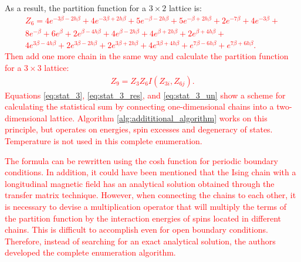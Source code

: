 \documentclass[preprint,12pt]{elsarticle}
\begin{document}
	As a result, the partition function for a $3 \times 2$ lattice is:
	\textcolor{red}{
	\begin{equation}
		\label{eq:stat_3_res}
		\begin{alignedat}{3}
			Z_6 = 4 e^{ - 3 \beta-2 h\beta} + 4 e^{- 3 \beta+2 h\beta} + 5 e^{- \beta-2 h\beta } + 5 e^{- \beta+2 h\beta } + 2 e^{-7 \beta} + 4 e^{-3 \beta} + \\
			8 e^{-\beta} + 6 e^{\beta} + 2 e^{\beta-4 h\beta } + 4 e^{\beta-2 h\beta } + 4 e^{\beta+2 h\beta } + 2 e^{\beta+4 h\beta } + \\
			4 e^{3 \beta-4 h\beta } + 2 e^{3 \beta-2 h\beta } + 2 e^{3 \beta+2 h\beta } + 4 e^{3 \beta+4 h\beta } + e^{7 \beta-6 h\beta } + e^{7 \beta+6 h\beta }.
		\end{alignedat}
	\end{equation}
}
\textcolor{red}{Then add one more chain in the same way and calculate the partition function for a $3 \times 3$ lattice:}
\textcolor{red}{
\begin{equation}
	\label{eq:stat_9_un}
	\begin{alignedat}{2}
		Z_9 =  Z_{3}Z_{6}I(Z_{3i},Z_{6j}).
	\end{alignedat}
\end{equation}
}
	\textcolor{red}{Equations \eqref{eq:stat_3}, \eqref{eq:stat_3_res}, and \eqref{eq:stat_3_un} show a scheme for calculating the statistical sum by connecting one-dimensional chains into a two-dimensional lattice. Algorithm \ref{alg:addititional_algorithm} \cite{trukhin2024glaurung} works on this principle, but operates on energies, spin excesses and degeneracy of states. Temperature is not used in this complete enumeration.}
	
	\textcolor{red}{The formula can be rewritten using the cosh function for periodic boundary conditions. In addition, it could have been mentioned that the Ising chain with a longitudinal magnetic field has an analytical solution obtained through the transfer matrix technique. However, when connecting the chains to each other, it is necessary to devise a multiplication operator that will multiply the terms of the partition function by the interaction energies of spins located in different chains. This is difficult to accomplish even for open boundary conditions. Therefore, instead of searching for an exact analytical solution, the authors developed the complete enumeration algorithm.}
	
\end{document}
